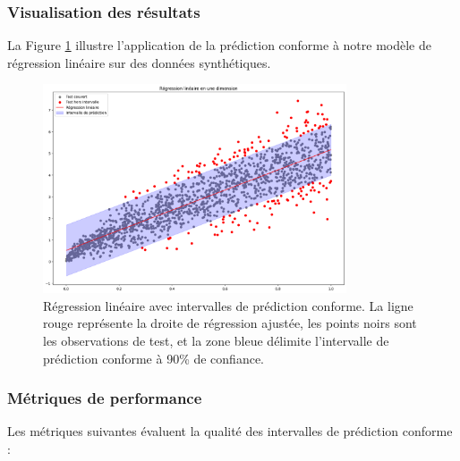 \documentclass[a4paper,12pt]{article}
\begin{document}
\subsubsection{Visualisation des résultats}

La Figure \ref{fig:regression_conforme} illustre l'application de la prédiction conforme à notre modèle de régression linéaire sur des données synthétiques.

\begin{figure}[h]
\centering
\includegraphics[width=0.8\textwidth]{conformal_prediction_regression.png}
\caption{Régression linéaire avec intervalles de prédiction conforme. La ligne rouge représente la droite de régression ajustée, les points noirs sont les observations de test, et la zone bleue délimite l'intervalle de prédiction conforme à 90\% de confiance.}
\label{fig:regression_conforme}
\end{figure}

\subsubsection{Métriques de performance}

Les métriques suivantes évaluent la qualité des intervalles de prédiction conforme :\\
\end{document}
